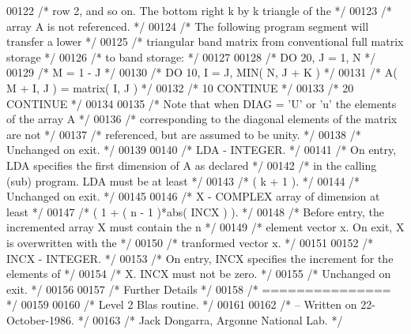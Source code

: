 \begin{DoxyCode}
00122 \textcolor{comment}{/*           row 2, and so on. The bottom right k by k triangle of the */}
00123 \textcolor{comment}{/*           array A is not referenced. */}
00124 \textcolor{comment}{/*           The following program segment will transfer a lower */}
00125 \textcolor{comment}{/*           triangular band matrix from conventional full matrix storage */}
00126 \textcolor{comment}{/*           to band storage: */}
00127 
00128 \textcolor{comment}{/*                 DO 20, J = 1, N */}
00129 \textcolor{comment}{/*                    M = 1 - J */}
00130 \textcolor{comment}{/*                    DO 10, I = J, MIN( N, J + K ) */}
00131 \textcolor{comment}{/*                       A( M + I, J ) = matrix( I, J ) */}
00132 \textcolor{comment}{/*              10    CONTINUE */}
00133 \textcolor{comment}{/*              20 CONTINUE */}
00134 
00135 \textcolor{comment}{/*           Note that when DIAG = 'U' or 'u' the elements of the array A */}
00136 \textcolor{comment}{/*           corresponding to the diagonal elements of the matrix are not */}
00137 \textcolor{comment}{/*           referenced, but are assumed to be unity. */}
00138 \textcolor{comment}{/*           Unchanged on exit. */}
00139 
00140 \textcolor{comment}{/*  LDA    - INTEGER. */}
00141 \textcolor{comment}{/*           On entry, LDA specifies the first dimension of A as declared */}
00142 \textcolor{comment}{/*           in the calling (sub) program. LDA must be at least */}
00143 \textcolor{comment}{/*           ( k + 1 ). */}
00144 \textcolor{comment}{/*           Unchanged on exit. */}
00145 
00146 \textcolor{comment}{/*  X      - COMPLEX          array of dimension at least */}
00147 \textcolor{comment}{/*           ( 1 + ( n - 1 )*abs( INCX ) ). */}
00148 \textcolor{comment}{/*           Before entry, the incremented array X must contain the n */}
00149 \textcolor{comment}{/*           element vector x. On exit, X is overwritten with the */}
00150 \textcolor{comment}{/*           tranformed vector x. */}
00151 
00152 \textcolor{comment}{/*  INCX   - INTEGER. */}
00153 \textcolor{comment}{/*           On entry, INCX specifies the increment for the elements of */}
00154 \textcolor{comment}{/*           X. INCX must not be zero. */}
00155 \textcolor{comment}{/*           Unchanged on exit. */}
00156 
00157 \textcolor{comment}{/*  Further Details */}
00158 \textcolor{comment}{/*  =============== */}
00159 
00160 \textcolor{comment}{/*  Level 2 Blas routine. */}
00161 
00162 \textcolor{comment}{/*  -- Written on 22-October-1986. */}
00163 \textcolor{comment}{/*     Jack Dongarra, Argonne National Lab. */}

\end{DoxyCode}
